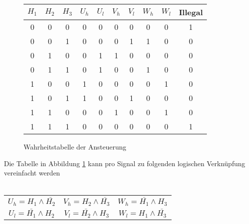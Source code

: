         \begin{figure}[h!]
            \begin{tabular}{ccc||cc|cc|cc||c}
                 $H_1$ & $H_2$ & $H_3$ & $U_h$ & $U_l$ & $V_h$ & $V_l$ & $W_h$ & $W_l$ & Illegal\\
            \hline 0   &   0   &   0   &   0   &   0   &   0   &   0   &   0   &   0   &   1\\
                   0   &   0   &   1   &   0   &   0   &   0   &   1   &   1   &   0   &   0\\
                   0   &   1   &   0   &   0   &   1   &   1   &   0   &   0   &   0   &   0\\
                   0   &   1   &   1   &   0   &   1   &   0   &   0   &   1   &   0   &   0\\
                   1   &   0   &   0   &   1   &   0   &   0   &   0   &   0   &   1   &   0\\
                   1   &   0   &   1   &   1   &   0   &   0   &   1   &   0   &   0   &   0\\
                   1   &   1   &   0   &   0   &   0   &   1   &   0   &   0   &   1   &   0\\
                   1   &   1   &   1   &   0   &   0   &   0   &   0   &   0   &   0   &   1\\
            \end{tabular}
           	\centering
           	\caption{Wahrheitstabelle der Ansteuerung} 
            \label{abb:WahrheitstabelleAnsteuerung}
        \end{figure}
        \parindent 0pt Die Tabelle in Abbildung \ref{abb:WahrheitstabelleAnsteuerung} kann pro Signal zu folgenden logischen Verknüpfung vereinfacht werden\\
        \\
        \begin{tabular}{ccc}
            $U_h = H_1 \wedge \bar{H_2}$ & $V_h = H_2 \wedge \bar{H_3}$ & $W_h = \bar{H_1} \wedge H_3$\\
            $U_l = \bar{H_1} \wedge H_2$ & $V_l = \bar{H_2} \wedge H_3$ & $W_l = H_1 \wedge \bar{H_3}$
        \end{tabular}
